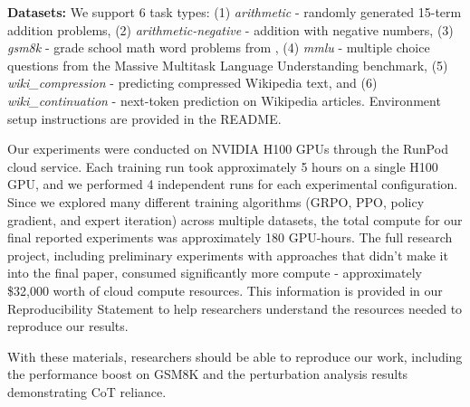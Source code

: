 \documentclass{article}
\begin{document}
\textbf{Datasets:} We support 6 task types: (1) \textit{arithmetic} - randomly generated 15-term addition problems, (2) \textit{arithmetic-negative} - addition with negative numbers, (3) \textit{gsm8k} - grade school math word problems from \citet{cobbe2021gsm8k}, (4) \textit{mmlu} - multiple choice questions from the Massive Multitask Language Understanding benchmark, (5) \textit{wiki\_compression} - predicting compressed Wikipedia text, and (6) \textit{wiki\_continuation} - next-token prediction on Wikipedia articles. Environment setup instructions are provided in the README. 

Our experiments were conducted on NVIDIA H100 GPUs through the RunPod cloud service. Each training run took approximately 5 hours on a single H100 GPU, and we performed 4 independent runs for each experimental configuration. Since we explored many different training algorithms (GRPO, PPO, policy gradient, and expert iteration) across multiple datasets, the total compute for our final reported experiments was approximately 180 GPU-hours. The full research project, including preliminary experiments with approaches that didn't make it into the final paper, consumed significantly more compute - approximately \$32,000 worth of cloud compute resources. This information is provided in our Reproducibility Statement to help researchers understand the resources needed to reproduce our results.

With these materials, researchers should be able to reproduce our work, including the performance boost on GSM8K and the perturbation analysis results demonstrating CoT reliance.



\end{document}
